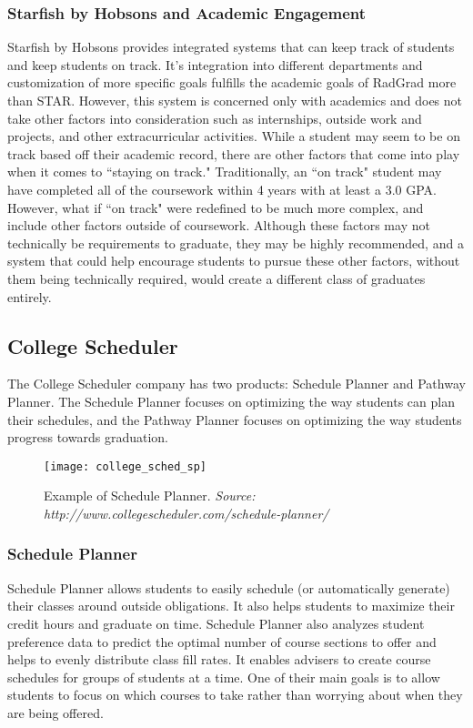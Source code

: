 \subsubsection{Starfish by Hobsons and Academic Engagement}
Starfish by Hobsons provides integrated systems that can keep track of students and keep students on track. It's integration into different departments and customization of more specific goals fulfills the academic goals of RadGrad more than STAR. However, this system is concerned only with academics and does not take other factors into consideration such as internships, outside work and projects, and other extracurricular activities. While a student may seem to be on track based off their academic record, there are other factors that come into play when it comes to ``staying on track." Traditionally, an ``on track" student may have completed all of the coursework within 4 years with at least a 3.0 GPA. However, what if ``on track" were redefined to be much more complex, and include other factors outside of coursework. Although these factors may not technically be requirements to graduate, they may be highly recommended, and a system that could help encourage students to pursue these other factors, without them being technically required, would create a different class of graduates entirely. 

\subsection{College Scheduler}
The College Scheduler company has two products: Schedule Planner and Pathway Planner. The Schedule Planner focuses on optimizing the way students can plan their schedules, and the Pathway Planner focuses on optimizing the way students progress towards graduation.

\begin{figure}[h]
\centering
\texttt{[image: college\_sched\_sp]}
\caption{Example of Schedule Planner. \textit{Source: http://www.collegescheduler.com/schedule-planner/}}
\end{figure}


\subsubsection{Schedule Planner}
Schedule Planner allows students to easily schedule (or automatically generate) their classes around outside obligations. It also helps students to maximize their credit hours and graduate on time. Schedule Planner also analyzes student preference data to predict the optimal number of course sections to offer and helps to evenly distribute class fill rates. It enables advisers to create course schedules for groups of students at a time. One of their main goals is to allow students to focus on which courses to take rather than worrying about when they are being offered.

